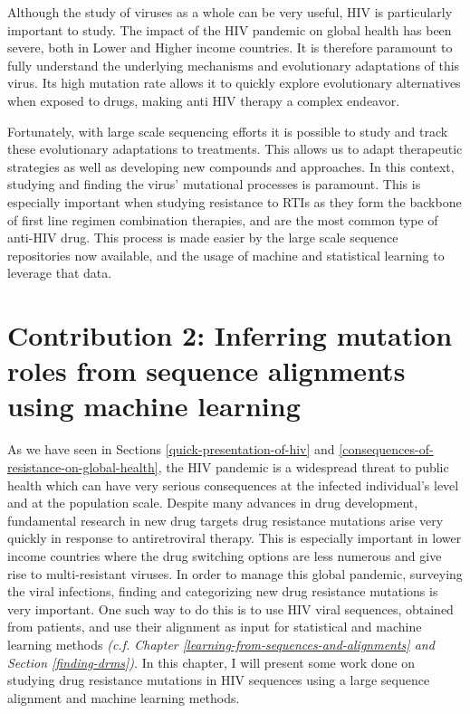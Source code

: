 \documentclass[
  11pt,
  twoside,
  BCOR=10mm,
  listof=totoc]{scrbook}
\begin{document}
Although the study of viruses as a whole can be very useful, HIV is particularly important to study. The impact of the HIV pandemic on global health has been severe, both in Lower and Higher income countries. It is therefore paramount to fully understand the underlying mechanisms and evolutionary adaptations of this virus. Its high mutation rate allows it to quickly explore evolutionary alternatives when exposed to drugs, making anti HIV therapy a complex endeavor.

Fortunately, with large scale sequencing efforts it is possible to study and track these evolutionary adaptations to treatments. This allows us to adapt therapeutic strategies as well as developing new compounds and approaches. In this context, studying and finding the virus' mutational processes is paramount. This is especially important when studying resistance to RTIs as they form the backbone of first line regimen combination therapies, and are the most common type of anti-HIV drug. This process is made easier by the large scale sequence repositories now available, and the usage of machine and statistical learning to leverage that data.

\printbibliography[segment=\therefsegment,heading=subbibintoc,title={References for chapter \thechapter}]

\hypertarget{HIV-paper}{%
\chapter{Contribution 2: Inferring mutation roles from sequence alignments using machine learning}\label{HIV-paper}}

As we have seen in Sections \ref{quick-presentation-of-hiv} and \ref{consequences-of-resistance-on-global-health}, the HIV pandemic is a widespread threat to public health which can have very serious consequences at the infected individual's level and at the population scale. Despite many advances in drug development, fundamental research in new drug targets drug resistance mutations arise very quickly in response to antiretroviral therapy. This is especially important in lower income countries where the drug switching options are less numerous and give rise to multi-resistant viruses. In order to manage this global pandemic, surveying the viral infections, finding and categorizing new drug resistance mutations is very important. One such way to do this is to use HIV viral sequences, obtained from patients, and use their alignment as input for statistical and machine learning methods \emph{(c.f. Chapter \ref{learning-from-sequences-and-alignments} and Section \ref{finding-drms})}. In this chapter, I will present some work done on studying drug resistance mutations in HIV sequences using a large sequence alignment and machine learning methods.
\end{document}

